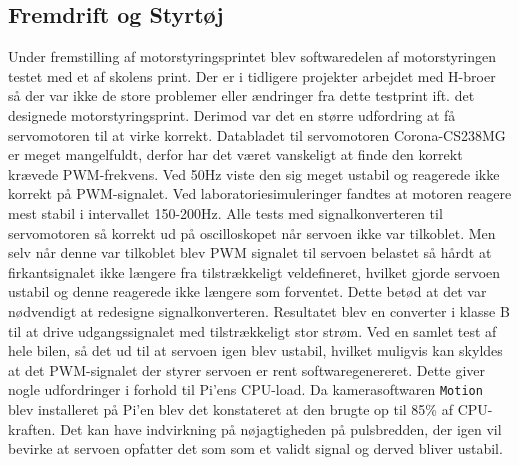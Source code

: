 \subsection{Fremdrift og Styrtøj} \label{sec:hwi_motor_styring}
Under fremstilling af motorstyringsprintet blev softwaredelen af motorstyringen testet med et af skolens print. 
Der er i tidligere projekter arbejdet med H-broer så der var ikke de store problemer eller ændringer fra dette testprint ift. det designede motorstyringsprint.
Derimod var det en større udfordring at få servomotoren til at virke korrekt.  
Databladet til servomotoren Corona-CS238MG \cite{lib:Corona-CS238MG} er meget mangelfuldt, derfor har det været vanskeligt at finde den korrekt krævede PWM-frekvens. 
Ved 50Hz viste den sig meget ustabil og reagerede ikke korrekt på PWM-signalet. 
Ved laboratoriesimuleringer fandtes at motoren reagere mest stabil i intervallet 150-200Hz. 
Alle tests med signalkonverteren til servomotoren så korrekt ud på oscilloskopet når servoen ikke var tilkoblet. 
Men selv når denne var tilkoblet blev PWM signalet til servoen belastet så hårdt at firkantsignalet ikke længere fra tilstrækkeligt veldefineret, hvilket gjorde servoen ustabil og denne reagerede ikke længere som forventet. 
Dette betød at det var nødvendigt at redesigne signalkonverteren. 
Resultatet blev en converter i klasse B til at drive udgangssignalet med tilstrækkeligt stor strøm.
Ved en samlet test af hele bilen, så det ud til at servoen igen blev ustabil, hvilket muligvis kan skyldes at det PWM-signalet der styrer servoen er rent softwaregenereret. 
Dette giver nogle udfordringer i forhold til Pi'ens CPU-load. 
Da kamerasoftwaren \texttt{Motion} blev installeret på Pi'en blev det konstateret at den brugte op til 85\% af CPU-kraften. 
Det kan have indvirkning på nøjagtigheden på pulsbredden, der igen vil bevirke at servoen opfatter det som som et validt signal og derved bliver ustabil.

